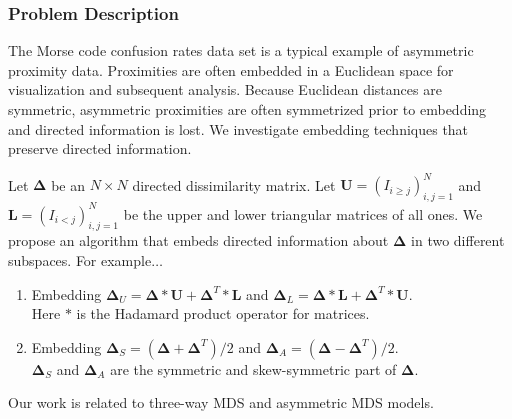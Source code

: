 \documentclass[professionalfonts,hyperref={pdfpagelabels=false,colorlinks=true,linkcolor=cyan}]{beamer}
\begin{document}
\begin{frame}
  \frametitle{Problem Description}
    The Morse code confusion rates data set is a typical example of
    asymmetric proximity data. Proximities are often embedded in a
    Euclidean space for visualization and subsequent analysis. Because
    Euclidean distances are symmetric, asymmetric proximities are
    often symmetrized prior to embedding and directed information is
    lost. We investigate embedding techniques that preserve directed
    information.
  
    \vskip10pt Let $\bm{\Delta}$ be an $N \times N$ directed
    dissimilarity matrix. Let $\mathbf{U} = (I_{i \geq j})_{i,j=1}^{N}$ and
    $\mathbf{L} = (I_{i < j})_{i,j=1}^{N}$ be the upper and
    lower triangular matrices of all ones. We propose an algorithm
    that embeds directed information about $\bm{\Delta}$ in two
    different subspaces. For example{$\ldots$}
 \begin{enumerate}
 \item Embedding $\bm{\Delta}_U = \bm{\Delta} \ast \mathbf{U} +
   \bm{\Delta}^{T} \ast \mathbf{L}$ and $\bm{\Delta}_{L} = \bm{\Delta}
   \ast \mathbf{L} + \bm{\Delta}^{T} \ast \mathbf{U}$.\\ Here $\ast$ is
   the Hadamard product operator for matrices.
 \item Embedding $\bm{\Delta}_S = (\bm{\Delta} + \bm{\Delta}^{T})/2$
   and $\bm{\Delta}_{A} = (\bm{\Delta} -
   \bm{\Delta}^{T})/2$.\\$\bm{\Delta}_S$ and $\bm{\Delta}_{A}$ are the
   symmetric and skew-symmetric part of $\bm{\Delta}$.
  \end{enumerate}
  Our work is related to three-way MDS and asymmetric MDS models.
\end{frame}
\end{document}
